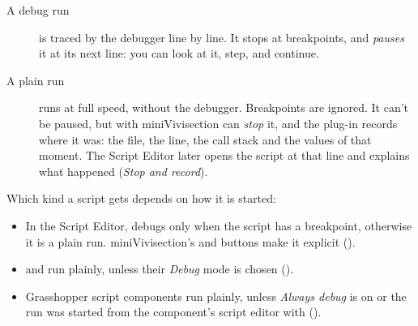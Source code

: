 \begin{description}
  \item[A debug run] is traced by the debugger line by line. It stops at breakpoints, and
         \emph{pauses} it at its next line: you can look at it, step, and continue.
  \item[A plain run] runs at full speed, without the debugger. Breakpoints are ignored. It can't be
        paused, but with miniVivisection  can \emph{stop} it, and the plug-in records
        where it was: the file, the line, the call stack and the values of that moment. The Script
        Editor later opens the script at that line and explains what happened (\emph{Stop and record}).
\end{description}

\begin{center}
\end{center}

Which kind a script gets depends on how it is started:

\begin{itemize}
  \item In the Script Editor,  debugs only when the script has a breakpoint, otherwise it is a
        plain run. miniVivisection's  and  buttons make it explicit ().
  \item {} and  run plainly, unless their \emph{Debug} mode is chosen
        ().
  \item Grasshopper script components run plainly, unless \emph{Always debug} is on or the run was
        started from the component's script editor with  ().
\end{itemize}


